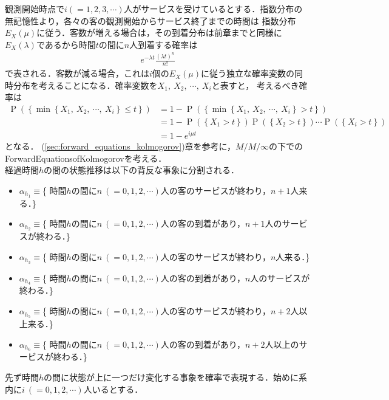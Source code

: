 \documentclass[a4j,papersize,disablejfam,slide,14pt]{jsarticle}
\def\min#1#2{\operatorname{min} \left\{ #1,\ #2 \right\}} %
\def\exp#1{e^{#1}} %
\def\prob#1{\operatorname{P} \left(\left\{ #1 \right\}\right)} %
\begin{document}
    観測開始時点で$i(=1,2,3,\cdots)$人がサービスを受けているとする．指数分布の無記憶性より，各々の客の観測開始からサービス終了までの時間は
    指数分布$E_X(\mu)$に従う．客数が増える場合は，その到着分布は前章までと同様に$E_X(\lambda)$であるから時間$t$の間に$n$人到着する確率は
    \begin{align}
    	\exp{-\lambda t} \frac{(\lambda t)^n}{n!}
    \end{align}
    で表される．客数が減る場合，これは$i$個の$E_X(\mu)$に従う独立な確率変数の同時分布を考えることになる．確率変数を$X_1,\ X_2,\ \cdots,\ X_i$と表すと，
    考えるべき確率は
    \begin{align}
    	\prob{ \min{X_1,\ X_2,\ \cdots}{X_i} \leq t } &= 1 - \prob{ \min{X_1,\ X_2,\ \cdots}{X_i} > t } \\
        &= 1 - \prob{X_1 > t}\prob{X_2 > t} \cdots \prob{X_i > t} \\
        &= 1 - \exp{i \mu t}
    \end{align}
    となる．
    (\ref{sec:forward_equations_kolmogorov})章を参考に，$M/M/\infty$の下での{\rm Forward\quad Equations\quad of\quad Kolmogorov}を考える．\\
	経過時間$h$の間の状態推移は以下の背反な事象に分割される．
    \begin{itemize}
    	\item $\alpha_h_1 \equiv $\{ 時間$h$の間に$n\ (=0,1,2,\cdots)$人の客のサービスが終わり，$n+1$人来る．\}
        \item $\alpha_h_2 \equiv $\{ 時間$h$の間に$n\ (=0,1,2,\cdots)$人の客の到着があり，$n+1$人のサービスが終わる．\}
        \item $\alpha_h_3 \equiv $\{ 時間$h$の間に$n\ (=0,1,2,\cdots)$人の客のサービスが終わり，$n$人来る．\}
        \item $\alpha_h_4 \equiv $\{ 時間$h$の間に$n\ (=0,1,2,\cdots)$人の客の到着があり，$n$人のサービスが終わる．\}
        \item $\alpha_h_5 \equiv $\{ 時間$h$の間に$n\ (=0,1,2,\cdots)$人の客のサービスが終わり，$n+2$人以上来る．\}
        \item $\alpha_h_6 \equiv $\{ 時間$h$の間に$n\ (=0,1,2,\cdots)$人の客の到着があり，$n+2$人以上のサービスが終わる．\}
    \end{itemize}
    先ず時間$h$の間に状態が上に一つだけ変化する事象を確率で表現する．始めに系内に$i\ (=0,1,2,\cdots)$人いるとする．
\end{document}
